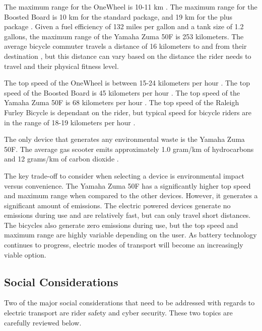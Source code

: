 The maximum range for the OneWheel is 10-11 km \cite{wheelcost}.
The maximum range for the Boosted Board is 10 km for the standard package, and 19 km for the plus package \cite{boardcost}.
Given a fuel efficiency of 132 miles per gallon and a tank size of 1.2 gallons, the maximum range of the Yamaha Zuma 50F is 253 kilometers.
The average bicycle commuter travels a distance of 16 kilometers to and from their destination \cite{BikePaper}, but this distance can vary based on the distance the rider needs to travel and their physical fitness level.
\par
The top speed of the OneWheel is between 15-24 kilometers per hour \cite{wheelcost}.
The top speed of the Boosted Board is 45 kilometers per hour \cite{boardcost}.
The top speed of the Yamaha Zuma 50F is 68 kilometers per hour \cite{Yamaha}.
The top speed of the Raleigh Furley Bicycle is dependant on the rider, but typical speed for bicycle riders are in the range of 18-19 kilometers per hour \cite{bikespeed}.
\par
The only device that generates any environmental waste is the Yamaha Zuma 50F. The average gas scooter emits approximately 1.0 gram/km of hydrocarbons and 12 grams/km of carbon dioxide \cite{emissions}.
\par
The key trade-off to consider when selecting a device is environmental impact versus convenience.
The Yamaha Zuma 50F has a significantly higher top speed and maximum range when compared to the other devices. 
However, it generates a significant amount of emissions. The electric powered devices generate no emissions during use and are relatively fast, but can only travel short distances. 
The bicycles also generate zero emissions during use, but the top speed and maximum range are highly variable depending on the user.
As battery technology continues to progress, electric modes of transport will become an increasingly viable option.

\subsection{Social Considerations}
Two of the major social considerations that need to be addressed with regards to electric transport are rider safety and cyber security. 
These two topics are carefully reviewed below.
